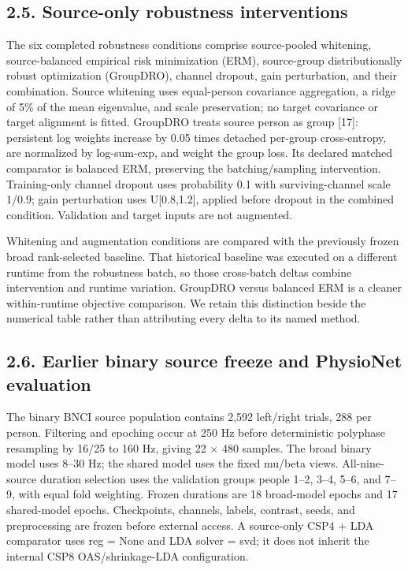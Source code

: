 \documentclass[11pt]{article}
\begin{document}
\subsection*{2.5. Source-only robustness interventions}
The six completed robustness conditions comprise source-pooled whitening, source-balanced empirical risk minimization (ERM), source-group distributionally robust optimization (GroupDRO), channel dropout, gain perturbation, and their combination. Source whitening uses equal-person covariance aggregation, a ridge of 5\% of the mean eigenvalue, and scale preservation; no target covariance or target alignment is fitted. GroupDRO treats source person as group [17]: persistent log weights increase by 0.05 times detached per-group cross-entropy, are normalized by log-sum-exp, and weight the group loss. Its declared matched comparator is balanced ERM, preserving the batching/sampling intervention. Training-only channel dropout uses probability 0.1 with surviving-channel scale 1/0.9; gain perturbation uses U[0.8,1.2], applied before dropout in the combined condition. Validation and target inputs are not augmented.

Whitening and augmentation conditions are compared with the previously frozen broad rank-selected baseline. That historical baseline was executed on a different runtime from the robustness batch, so those cross-batch deltas combine intervention and runtime variation. GroupDRO versus balanced ERM is a cleaner within-runtime objective comparison. We retain this distinction beside the numerical table rather than attributing every delta to its named method.

\subsection*{2.6. Earlier binary source freeze and PhysioNet evaluation}
The binary BNCI source population contains 2,592 left/right trials, 288 per person. Filtering and epoching occur at 250 Hz before deterministic polyphase resampling by 16/25 to 160 Hz, giving 22 $\times$ 480 samples. The broad binary model uses 8--30 Hz; the shared model uses the fixed mu/beta views. All-nine-source duration selection uses the validation groups people 1--2, 3--4, 5--6, and 7--9, with equal fold weighting. Frozen durations are 18 broad-model epochs and 17 shared-model epochs. Checkpoints, channels, labels, contrast, seeds, and preprocessing are frozen before external access. A source-only CSP4 + LDA comparator uses reg = None and LDA solver = svd; it does not inherit the internal CSP8 OAS/shrinkage-LDA configuration.
\end{document}

